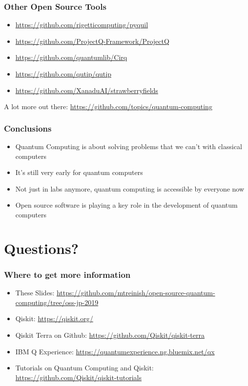 \documentclass[aspectratio=169,11pt,hyperref={colorlinks=true}]{beamer}
\begin{document}
\begin{frame}
    \frametitle{Other Open Source Tools}
    \begin{itemize}
        \item \href{https://github.com/rigetticomputing/pyquil}{https://github.com/rigetticomputing/pyquil}
        \item \href{https://github.com/ProjectQ-Framework/ProjectQ}{https://github.com/ProjectQ-Framework/ProjectQ}
        \item \href{https://github.com/quantumlib/Cirq}{https://github.com/quantumlib/Cirq}
        \item \href{https://github.com/qutip/qutip}{https://github.com/qutip/qutip}
        \item \href{https://github.com/XanaduAI/strawberryfields}{https://github.com/XanaduAI/strawberryfields}
    \end{itemize}
    A lot more out there:
    \href{https://github.com/topics/quantum-computing}{https://github.com/topics/quantum-computing}
\end{frame}

\begin{frame}
    \frametitle{Conclusions}
    \begin{itemize}
        \item Quantum Computing is about solving problems that we can't with
            classical computers
        \item It's still very early for quantum computers
        \item Not just in labs anymore, quantum computing is accessible by
            everyone now
        \item Open source software is playing a key role in the development of quantum computers
    \end{itemize}
\end{frame}

\section{Questions?}
\begin{frame}
\frametitle{Where to get more information}
    \begin{itemize}
        \item These Slides: \href{https://github.com/mtreinish/open-source-quantum-computing/tree/oss-jp-2019}{https://github.com/mtreinish/open-source-quantum-computing/tree/oss-jp-2019}
        \item Qiskit: \href{https://qiskit.org/}{https://qiskit.org/}
        \item Qiskit Terra on Github: \href{https://github.com/Qiskit/qiskit-terra}{https://github.com/Qiskit/qiskit-terra}
        \item IBM Q Experience: \href{https://quantumexperience.ng.bluemix.net/qx}{https://quantumexperience.ng.bluemix.net/qx}
        \item Tutorials on Quantum Computing and Qiskit: \href{https://github.com/Qiskit/qiskit-tutorials}{https://github.com/Qiskit/qiskit-tutorials}
    \end{itemize}
\end{frame}
\end{document}

